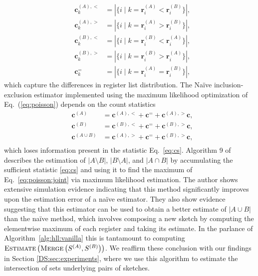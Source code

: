 \documentclass{report}
\newcommand{\algoname}[1]{\textnormal{\textsc{#1}}}
\begin{document}
\begin{equation} \label{eq:cs}
	\begin{alignedat}{2}
		&\mathbf{c}^{(A),<}_k &= |\{i \mid k = \mathbf{r}^{(A)}_i < \mathbf{r}^{(B)}_i \}|, \\
		&\mathbf{c}^{(A),>}_k &= |\{i \mid k = \mathbf{r}^{(A)}_i > \mathbf{r}^{(B)}_i \}|, \\
		&\mathbf{c}^{(B),<}_k &= |\{i \mid k = \mathbf{r}^{(B)}_i < \mathbf{r}^{(A)}_i \}|, \\ 
		&\mathbf{c}^{(B),>}_k &= |\{i \mid k = \mathbf{r}^{(B)}_i > \mathbf{r}^{(A)}_i \}|, \\
		&\mathbf{c}^{=}_k &= |\{i \mid k = \mathbf{r}^{(A)}_i = \mathbf{r}^{(B)}_i \}|,
  \end{alignedat}
\end{equation} 
%
which capture the differences in register list distribution.
The Na\"ive inclusion-exclusion estimator implemented using the maximum likelihood optimization of Eq.~(\ref{eq:poisson}) depends on the count statistics %
\begin{equation} \label{eq:naivecs}
	\begin{alignedat}{2}
		&\mathbf{c}^{(A)} &= \mathbf{c}^{(A),<} + \mathbf{c}^= + \mathbf{c}^{(A),>}\mathbf{c}, \\
		&\mathbf{c}^{(B)} &= \mathbf{c}^{(B),<} + \mathbf{c}^= + \mathbf{c}^{(B),>}\mathbf{c}, \\
		&\mathbf{c}^{(A \cup B)} &= \mathbf{c}^{(A),>} + \mathbf{c}^= + \mathbf{c}^{(B),>}\mathbf{c}, \\
  \end{alignedat}
\end{equation} 
%
which loses information present in the statistic Eq.~\eqref{eq:cs}.
Algorithm 9 of \cite{ertl2017new} describes the estimation of $|A \setminus B|$, $|B \setminus A|$, and $|A \cap B|$ by accumulating the sufficient statistic \eqref{eq:cs} and using it to find the maximum of Eq.~\eqref{eq:poisson:joint} via maximum likelihood estimation.
The author shows extensive simulation evidence indicating that this method significantly improves upon the estimation error of a na\"ive estimator.
They also show evidence suggesting that this estimator can be used to obtain a better estimate of $|A \cup B|$ than the na\"ive method, which involves composing a new sketch by computing the elementwise maximum of each register and taking its estimate.
In the parlance of Algorithm~\ref{alg:hll:vanilla} this is tantamount to computing $\algoname{Estimate} \left ( \algoname{Merge} \left ( S^{(A)}, S^{(B)} \right ) \right )$. 
We reaffirm these conclusion with our findings in Section \ref{DS:sec:experiments}, where we use this algorithm to estimate the intersection of sets underlying pairs of sketches.
\end{document}
